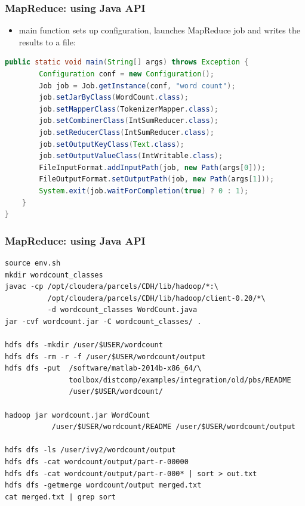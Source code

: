 \documentclass{beamer}
\begin{document}
\begin{frame}[fragile]
 \frametitle{MapReduce: using Java API}

\begin{itemize}
  \item {\color{blue}main} function sets up configuration, launches MapReduce job and writes the results to a file:
\end{itemize}
{\color{mycolorcode}
  \begin{lstlisting}[frame=single, basicstyle=\tiny,language=java]
    public static void main(String[] args) throws Exception {
        Configuration conf = new Configuration();
        Job job = Job.getInstance(conf, "word count");
        job.setJarByClass(WordCount.class);
        job.setMapperClass(TokenizerMapper.class);
        job.setCombinerClass(IntSumReducer.class);
        job.setReducerClass(IntSumReducer.class);
        job.setOutputKeyClass(Text.class);
        job.setOutputValueClass(IntWritable.class);
        FileInputFormat.addInputPath(job, new Path(args[0]));
        FileOutputFormat.setOutputPath(job, new Path(args[1]));
        System.exit(job.waitForCompletion(true) ? 0 : 1);
    }
}
  \end{lstlisting}
}
\end{frame}

\begin{frame}[fragile]
 \frametitle{MapReduce: using Java API}
{\color{mycolorcli}
  \begin{lstlisting}[frame=single, basicstyle=\tiny]
source env.sh
mkdir wordcount_classes
javac -cp /opt/cloudera/parcels/CDH/lib/hadoop/*:\
          /opt/cloudera/parcels/CDH/lib/hadoop/client-0.20/*\ 
          -d wordcount_classes WordCount.java
jar -cvf wordcount.jar -C wordcount_classes/ .

hdfs dfs -mkdir /user/$USER/wordcount
hdfs dfs -rm -r -f /user/$USER/wordcount/output
hdfs dfs -put  /software/matlab-2014b-x86_64/\
               toolbox/distcomp/examples/integration/old/pbs/README 
               /user/$USER/wordcount/

hadoop jar wordcount.jar WordCount 
           /user/$USER/wordcount/README /user/$USER/wordcount/output

hdfs dfs -ls /user/ivy2/wordcount/output
hdfs dfs -cat wordcount/output/part-r-00000
hdfs dfs -cat wordcount/output/part-r-000* | sort > out.txt
hdfs dfs -getmerge wordcount/output merged.txt
cat merged.txt | grep sort
\end{lstlisting}
}
\end{frame}
\end{document}
